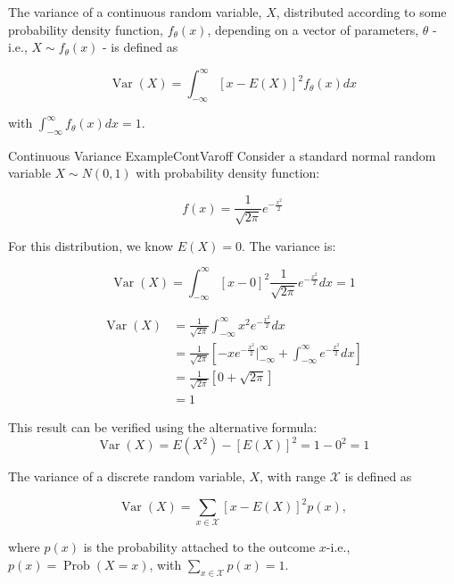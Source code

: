 \begin{definition}
    The variance of a continuous random variable, $X$, distributed according to some probability density function, $f_{\theta}(x)$, depending on a vector of parameters, $\theta$ - i.e., $X \sim f_{\theta}(x)$ - is defined as

    $$
    \operatorname{Var}(X)=\int_{-\infty}^{\infty}[x-E(X)]^{2} f_{\theta}(x) d x
    $$
    
    with $\int_{-\infty}^{\infty} f_{\theta}(x) d x=1$.
\end{definition}

\begin{ocg}{Continuous Variance Example}{ContVar}{off}
    Consider a standard normal random variable \( X \sim N(0,1) \) with probability density function:
    
    \[ f(x) = \frac{1}{\sqrt{2\pi}} e^{-\frac{x^2}{2}} \]
    
    For this distribution, we know \( E(X) = 0 \). The variance is:
    
    \[ \operatorname{Var}(X) = \int_{-\infty}^{\infty} [x-0]^2 \frac{1}{\sqrt{2\pi}} e^{-\frac{x^2}{2}} dx = 1 \]

    \[ \begin{aligned}
    \operatorname{Var}(X) &= \frac{1}{\sqrt{2\pi}} \int_{-\infty}^{\infty} x^2 e^{-\frac{x^2}{2}} dx \\
    &= \frac{1}{\sqrt{2\pi}} \left[ -x e^{-\frac{x^2}{2}} \bigg|_{-\infty}^{\infty} + \int_{-\infty}^{\infty} e^{-\frac{x^2}{2}} dx \right] \\
    &= \frac{1}{\sqrt{2\pi}} \left[ 0 + \sqrt{2\pi} \right] \\
    &= 1
    \end{aligned} \]
    
    This result can be verified using the alternative formula:
    \[ \operatorname{Var}(X) = E(X^2) - [E(X)]^2 = 1 - 0^2 = 1 \]
\end{ocg}

\begin{definition}
    The variance of a discrete random variable, $X$, with range $\mathcal{X}$ is defined as

    $$
    \operatorname{Var}(X)=\sum_{x \in \mathcal{X}}[x-E(X)]^{2} p(x),
    $$
    
    where $p(x)$ is the probability attached to the outcome $x$-i.e., $p(x)=\operatorname{Prob}(X=x)$, with $\sum_{x \in \mathcal{X}} p(x)=1$.
\end{definition}


